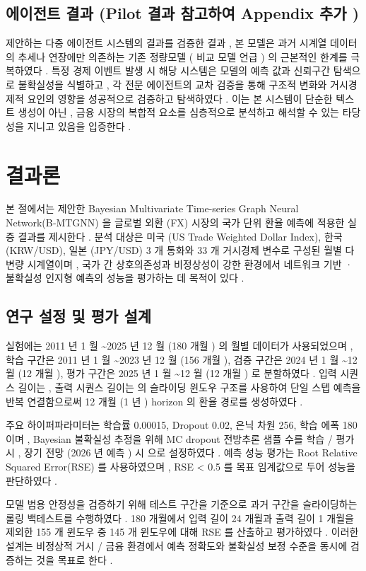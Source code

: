 \documentclass[10pt,a4paper]{article}
\begin{document}
\subsection{에이전트 결과 (Pilot 결과 참고하여 Appendix 추가 )}
제안하는 다중 에이전트 시스템의 결과를 검증한 결과 , 본 모델은 과거 시계열 데이터의 추세나 연장에만 의존하는 기존 정량모델 ( 비교 모델 언급 ) 의 근본적인 한계를 극복하였다 . 특정 경제 이벤트 발생 시 해당 시스템은 모델의 예측 값과 신뢰구간 탐색으로 불확실성을 식별하고 , 각 전문 에이전트의 교차 검증을 통해 구조적 변화와 거시경제적 요인의 영향을 성공적으로 검증하고 탐색하였다 . 이는 본 시스템이 단순한 텍스트 생성이 아닌 , 금융 시장의 복합적 요소를 심층적으로 분석하고 해석할 수 있는 타당성을 지니고 있음을 입증한다 .

\section{결과론}
본 절에서는 제안한 Bayesian Multivariate Time-series Graph Neural Network(B‑MTGNN) 을 글로벌 외환 (FX) 시장의 국가 단위 환율 예측에 적용한 실증 결과를 제시한다 . 분석 대상은 미국 (US Trade Weighted Dollar Index), 한국 (KRW/USD), 일본 (JPY/USD) 3 개 통화와 33 개 거시경제 변수로 구성된 월별 다변량 시계열이며 , 국가 간 상호의존성과 비정상성이 강한 환경에서 네트워크 기반 · 불확실성 인지형 예측의 성능을 평가하는 데 목적이 있다 .

\subsection{연구 설정 및 평가 설계}
실험에는 2011 년 1 월 \textasciitilde{}2025 년 12 월 (180 개월 ) 의 월별 데이터가 사용되었으며 , 학습 구간은 2011 년 1 월 \textasciitilde{}2023 년 12 월 (156 개월 ), 검증 구간은 2024 년 1 월 \textasciitilde{}12 월 (12 개월 ), 평가 구간은 2025 년 1 월 \textasciitilde{}12 월 (12 개월 ) 로 분할하였다 . 입력 시퀀스 길이는 , 출력 시퀀스 길이는 의 슬라이딩 윈도우 구조를 사용하여 단일 스텝 예측을 반복 연결함으로써 12 개월 (1 년 ) horizon 의 환율 경로를 생성하였다 .

주요 하이퍼파라미터는 학습률 0.00015, Dropout 0.02, 은닉 차원 256, 학습 에폭 180 이며 , Bayesian 불확실성 추정을 위해 MC dropout 전방추론 샘플 수를 학습 / 평가 시 , 장기 전망 (2026 년 예측 ) 시 으로 설정하였다 . 예측 성능 평가는 Root Relative Squared Error(RSE) 를 사용하였으며 , RSE < 0.5 를 목표 임계값으로 두어 성능을 판단하였다 .

모델 범용 안정성을 검증하기 위해 테스트 구간을 기준으로 과거 구간을 슬라이딩하는 롤링 백테스트를 수행하였다 . 180 개월에서 입력 길이 24 개월과 출력 길이 1 개월을 제외한 155 개 윈도우 중 145 개 윈도우에 대해 RSE 를 산출하고 평가하였다 . 이러한 설계는 비정상적 거시 / 금융 환경에서 예측 정확도와 불확실성 보정 수준을 동시에 검증하는 것을 목표로 한다 .
\end{document}
